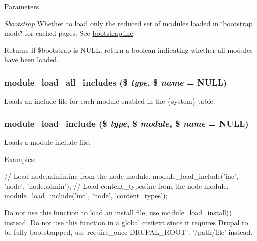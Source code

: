 \begin{DoxyParams}{Parameters}
\item[{\em \$bootstrap}]Whether to load only the reduced set of modules loaded in \char`\"{}bootstrap mode\char`\"{} for cached pages. See \hyperlink{bootstrap_8inc}{bootstrap.inc}.\end{DoxyParams}
\begin{DoxyReturn}{Returns}
If \$bootstrap is NULL, return a boolean indicating whether all modules have been loaded. 
\end{DoxyReturn}
\hypertarget{module_8inc_a4e2123e44529b4d307fc1ac78519e966}{
\subsubsection[{module\_\-load\_\-all\_\-includes}]{\setlength{\rightskip}{0pt plus 5cm}module\_\-load\_\-all\_\-includes (\$ {\em type}, \/  \$ {\em name} = {\ttfamily NULL})}}
\label{module_8inc_a4e2123e44529b4d307fc1ac78519e966}
Loads an include file for each module enabled in the \{system\} table. \hypertarget{module_8inc_a49098ed4d33650ee5ab52aab40982423}{
\subsubsection[{module\_\-load\_\-include}]{\setlength{\rightskip}{0pt plus 5cm}module\_\-load\_\-include (\$ {\em type}, \/  \$ {\em module}, \/  \$ {\em name} = {\ttfamily NULL})}}
\label{module_8inc_a49098ed4d33650ee5ab52aab40982423}
Loads a module include file.

Examples: 
\begin{DoxyCode}
   // Load node.admin.inc from the node module.
   module_load_include('inc', 'node', 'node.admin');
   // Load content_types.inc from the node module.
   module_load_include('inc', 'node', 'content_types');
\end{DoxyCode}


Do not use this function to load an install file, use \hyperlink{module_8inc_a77a6101f363c066eafbe29b26af5bfd3}{module\_\-load\_\-install()} instead. Do not use this function in a global context since it requires Drupal to be fully bootstrapped, use require\_\-once DRUPAL\_\-ROOT . '/path/file' instead.


